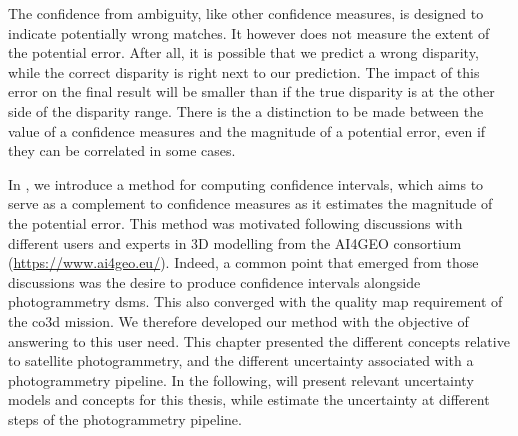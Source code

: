 The confidence from ambiguity, like other confidence measures, is designed to indicate potentially wrong matches. It however does not measure the extent of the potential error. After all, it is possible that we predict a wrong disparity, while the correct disparity is right next to our prediction. The impact of this error on the final result will be smaller than if the true disparity is at the other side of the disparity range. There is the a distinction to be made between the value of a confidence measures and the magnitude of a potential error, even if they can be correlated in some cases.

In , we introduce a method for computing confidence intervals, which aims to serve as a complement to confidence measures as it estimates the magnitude of the potential error. This method was motivated following discussions with different users and experts in 3D modelling from the AI4GEO consortium (\url{https://www.ai4geo.eu/}). Indeed, a common point that emerged from those discussions was the desire to produce confidence intervals alongside photogrammetry \acrshort{dsm}s. This also converged with the quality map requirement of the \acrshort{co3d} mission. We therefore developed our method with the objective of answering to this user need. This chapter presented the different concepts relative to satellite photogrammetry, and the different uncertainty associated with a photogrammetry pipeline. In the following,  will present relevant uncertainty models and concepts for this thesis, while  estimate the uncertainty at different steps of the photogrammetry pipeline.

\pagebreak
\blankpage
